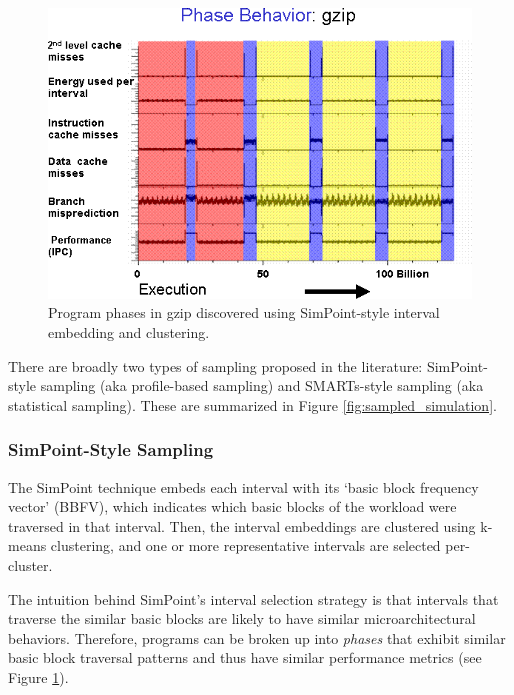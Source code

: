 \documentclass[sigplan,nonacm,10pt]{acmart}
\begin{document}
\begin{figure}
  \includegraphics[width=\linewidth]{multi-level-sim/simpoint-gzip_phases.png}
  \caption{Program phases in gzip discovered using SimPoint-style interval embedding and clustering\cite{simpoint3}.}
  \label{fig:simpoint}
\end{figure}

There are broadly two types of sampling proposed in the literature: SimPoint-style sampling\cite{simpoint3} (aka profile-based sampling) and SMARTs-style sampling\cite{smarts} (aka statistical sampling). These are summarized in Figure \ref{fig:sampled_simulation}.

\subsubsection{SimPoint-Style Sampling}

The SimPoint technique embeds each interval with its `basic block frequency vector' (BBFV), which indicates which basic blocks of the workload were traversed in that interval.
Then, the interval embeddings are clustered using k-means clustering, and one or more representative intervals are selected per-cluster.

The intuition behind SimPoint's interval selection strategy is that intervals that traverse the similar basic blocks are likely to have similar microarchitectural behaviors.
Therefore, programs can be broken up into \textit{phases} that exhibit similar basic block traversal patterns and thus have similar performance metrics (see Figure \ref{fig:simpoint}).
\end{document}
